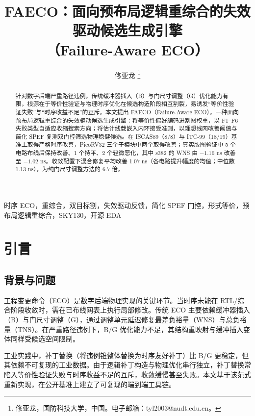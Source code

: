 \documentclass[journal]{IEEEtran}
\title{FAECO：面向预布局逻辑重综合的失效驱动候选生成引擎\\
（Failure-Aware ECO）}
\author{佟亚龙%
\thanks{佟亚龙，国防科技大学，中国。电子邮箱：tyl2003@nudt.edu.cn。}}
\begin{document}
\maketitle

\sloppy

\begin{abstract}
针对数字后端严重路径违例，传统缓冲器插入（B）与门尺寸调整（G）优化能力有限，根源在于等价性验证与物理时序优化在候选构造阶段相互割裂，易诱发“等价性验证失败”与“时序收益不足”的互斥。本文提出 FAECO（Failure-Aware ECO），一种面向预布局逻辑重综合的失效驱动候选生成引擎：将等价性偏好编码进割图权重，以 F1--F6 失败类型自适应收缩搜索方向；将估计线载嵌入内环接受准则，以理想线网改善阈值与简化 SPEF 复测双门控筛选物理稳健候选。在 ISCAS89（8/8）与 ITC-99（18/19）基准上取得严格时序改善，PicoRV32 三个子模块中两个取得改善；真实版图验证中 5 个电路布线后保持改善、1 个持平、2 个轻微恶化，其中 s382 的 WNS 由 $-1.16$ ns 改善至 $-1.02$ ns。收敛配置下混合修复平均改善 1.07 ns（各电路提升幅度的均值；中位数 1.13 ns），为纯门尺寸调整方法的 6.7 倍。
\end{abstract}

\begin{IEEEkeywords}
时序 ECO，重综合，双目标割，失效驱动反馈，简化 SPEF 门控，形式等价，预布局逻辑重综合，SKY130，开源 EDA
\end{IEEEkeywords}

\section{引言}

\subsection{背景与问题}

工程变更命令（ECO）是数字后端物理实现的关键环节。当时序未能在 RTL/综合阶段收敛时，需在已布线网表上执行局部修改。传统 ECO 主要依赖缓冲器插入（B）与门尺寸调整（G），通过调整单元延迟修复最差负裕量（WNS）与总负裕量（TNS）。在严重路径违例下，B/G 优化能力不足，其结构重映射与缓冲插入变体同样受候选空间限制\cite{chen2012metal,chen2012fixability,liang2012buffer,ho2010eco}。

工业实践中，补丁替换（将违例锥整体替换为时序友好补丁）比 B/G 更稳定，但其依赖不可复现的工业数据。由于逻辑补丁构造与物理优化串行独立，补丁替换常陷入等价性验证失败与时序收益不足的互斥，收敛缓慢甚至失败。本文基于该范式重新实现，在公开基准上建立了可复现的端到端工具链。
\end{document}
